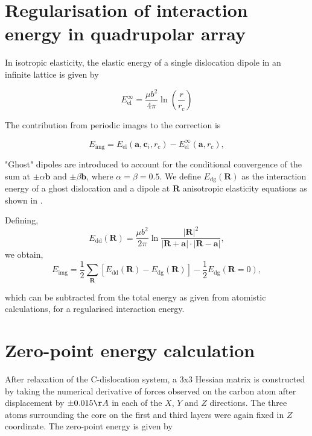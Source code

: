 \documentclass[a4paper,12pt,oneside,print,numbered,index,PageStyleIII]{PhDThesisPSnPDF}
\begin{document}

\begin{appendices} %



\chapter{Regularisation of interaction energy in quadrupolar array}
\label{sec:orge7295bf}
\label{sec:Ainteractionenergy}


In isotropic elasticity, the elastic energy of a single dislocation dipole in an
infinite lattice is given by


\[ E_{\text{el}}^{\infty} = \frac{\mu b^2}{4\pi} \ln \left( \frac{r}{r_{c}} \right)  \]

The contribution from periodic images to the correction is

\[ E_{\text{img} } = E_{\text{el}} (\mathbf{a}, \mathbf{c}_i , r_c) - E_{\text{el}}^{\infty}
  (\mathbf{a}, r_c),\]

"Ghost" dipoles are introduced to account for the conditional convergence of the sum at \(\pm\alpha
  \mathbf{b}\) and \(\pm \beta\mathbf{b}\), where \(\alpha = \beta = 0.5\). We define \(E_{\text{dg}} (\mathbf{R})\) as the
interaction energy of a ghost dislocation and a dipole at \(\mathbf{R}\) anisotropic elasticity
equations as shown in \cite{Cai2003}.


Defining,
 \[ E_{\text{dd}} (\mathbf{R}) = \frac{\mu b^2}{2\pi}
  \ln \frac{|\mathbf{R}|^2}{|\mathbf{R}+\mathbf{a}|\cdot|\mathbf{R}-\mathbf{a}|},
  \]
we obtain,
\[ E_{\text{img}} = \frac{1}{2}\sum_{\mathbf{R}} [ E_{\text{dd}} (\mathbf{R}) - E_{\text{dg}} (\mathbf{R}) ] - \frac{1}{2}
  E_{\text{dg}} (\mathbf{R} = 0),  \]

which can be subtracted from the total energy as given from atomistic calculations, for a
regularised interaction energy.


\chapter{Zero-point energy calculation}
\label{sec:org4779751}
\label{sec:zeropointenergy}

After relaxation of the C-dislocation system, a 3x3 Hessian matrix is constructed by taking the
numerical derivative of forces observed on the carbon atom after displacement by \(\pm 0.015 \AA\) in
each of the \(X\), \(Y\) and \(Z\) directions.  The three atoms surrounding the core on the first and
third layers were again fixed in \(Z\) coordinate. The zero-point energy is given by


\end{appendices}
\end{document}
